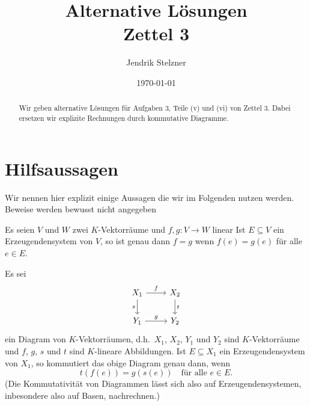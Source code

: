 \documentclass[a4paper,10pt,numbers=noenddot]{scrartcl}
\title{Alternative Lösungen \\ Zettel 3}
\author{Jendrik Stelzner}
\date{\today}
\begin{document}
\maketitle










\begin{abstract}
  Wir geben alternative Lösungen für Aufgaben 3, Teile (v) und (vi) von Zettel 3.
  Dabei ersetzen wir explizite Rechnungen durch kommutative Diagramme.
\end{abstract}










\section{Hilfsaussagen}

Wir nennen hier explizit einige Aussagen die wir im Folgenden nutzen werden.
Beweise werden bewusst nicht angegeben

\begin{lemma}
  Es seien $V$ und $W$ zwei $K$-Vektorräume und $f, g \colon V \to W$ linear
  Ist $E \subseteq V$ ein Erzeugendensystem von $V$, so ist genau dann $f = g$ wenn $f(e) = g(e)$ für alle $e \in E$.
\end{lemma}


\begin{corollary}
  Es sei
  \[
    \begin{tikzcd}
        X_1
        \arrow[r, "f"]
        \arrow[d, "s"']
      & X_2
        \arrow[d, "t"]
      \\
        Y_1
        \arrow[r, "g"]
      & Y_2
    \end{tikzcd}
  \]
  ein Diagram von $K$-Vektorräumen, d.h.\ $X_1$, $X_2$, $Y_1$ und $Y_2$ sind $K$-Vektorräume und $f$, $g$, $s$ und $t$ sind $K$-lineare Abbildungen.
  Ist $E \subseteq X_1$ ein Erzeugendensystem von $X_1$, so kommutiert das obige Diagram genau dann, wenn
  \[
    t(f(e)) = g(s(e))
    \quad
    \text{für alle $e \in E$}.
  \]
  (Die Kommutativität von Diagrammen lässt sich also auf Erzeugendensystemen, inbesondere also auf Basen, nachrechnen.)
\end{corollary}
\end{document}
